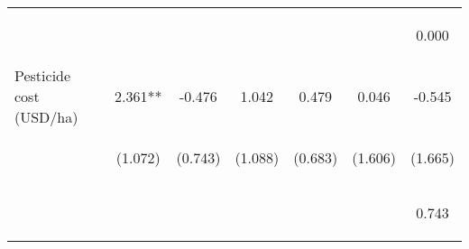 \begin{center}
\begin{tabular}{lcccccc}
\vspace{4pt} & \begin{footnotesize}[0.000]\end{footnotesize} & \begin{footnotesize}[0.884]\end{footnotesize} & \begin{footnotesize}[0.003]\end{footnotesize} & \begin{footnotesize}[0.188]\end{footnotesize} & \begin{footnotesize}[0.000]\end{footnotesize} & \begin{footnotesize}0.000\end{footnotesize} \\
Pesticide cost (USD/ha) & 2.361** & -0.476 & 1.042 & 0.479 & 0.046 & -0.545 \\
 & \begin{footnotesize}(1.072)\end{footnotesize} & \begin{footnotesize}(0.743)\end{footnotesize} & \begin{footnotesize}(1.088)\end{footnotesize} & \begin{footnotesize}(0.683)\end{footnotesize} & \begin{footnotesize}(1.606)\end{footnotesize} & \begin{footnotesize}(1.665)\end{footnotesize} \\
\vspace{4pt} & \begin{footnotesize}[0.028]\end{footnotesize} & \begin{footnotesize}[0.522]\end{footnotesize} & \begin{footnotesize}[0.338]\end{footnotesize} & \begin{footnotesize}[0.483]\end{footnotesize} & \begin{footnotesize}[0.977]\end{footnotesize} & \begin{footnotesize}0.743\end{footnotesize} \\

\end{tabular}
\end{center}
